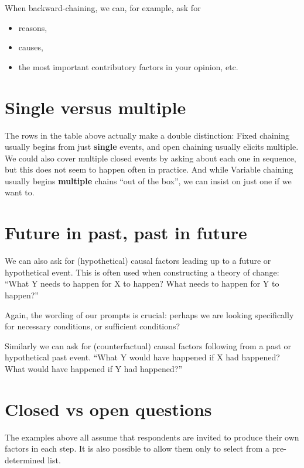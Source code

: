 \documentclass[
]{book}
\providecommand{\tightlist}{%
  \setlength{\itemsep}{0pt}\setlength{\parskip}{0pt}}
\begin{document}
When backward-chaining, we can, for example, ask for

\begin{itemize}
\tightlist
\item
  reasons,
\item
  causes,
\item
  the most important contributory factors in your opinion, etc.
\end{itemize}

\hypertarget{single-versus-multiple}{%
\section{Single versus multiple}\label{single-versus-multiple}}

The rows in the table above actually make a double distinction: Fixed chaining usually begins from just \textbf{single} events, and open chaining usually elicits multiple. We could also cover multiple closed events by asking about each one in sequence, but this does not seem to happen often in practice. And while Variable chaining usually begins \textbf{multiple} chains ``out of the box'', we can insist on just one if we want to.

\hypertarget{future-in-past-past-in-future}{%
\section{Future in past, past in future}\label{future-in-past-past-in-future}}

We can also ask for (hypothetical) causal factors leading up to a future or hypothetical event. This is often used when constructing a theory of change: ``What Y needs to happen for X to happen? What needs to happen for Y to happen?''

Again, the wording of our prompts is crucial: perhaps we are looking specifically for necessary conditions, or sufficient conditions?

Similarly we can ask for (counterfactual) causal factors following from a past or hypothetical past event. ``What Y would have happened if X had happened? What would have happened if Y had happened?''

\hypertarget{closed-vs-open-questions}{%
\section{Closed vs open questions}\label{closed-vs-open-questions}}

The examples above all assume that respondents are invited to produce their own factors in each step. It is also possible to allow them only to select from a pre-determined list. \citep{hodgkinson2004}
\end{document}
